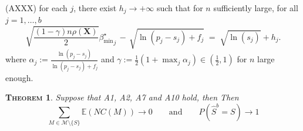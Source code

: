 \documentclass[aos]{imsart}
\theoremstyle{plain}
\newtheorem{thm}{\textsc{Theorem}}[section]
\newcommand{\E}{\mathbb{E}}
\newcommand{\M}{\mathcal{M}}
\newcommand{\bs}{\boldsymbol}
\begin{document}
(AXXX) for each $j$, there exist $h_j\to +\infty$ such that for $n$ sufficiently large, for all $j=1,\ldots,b$
    \begin{equation}\label{cond:suffIIregnonlinpen}
        \sqrt{\frac{(1-\gamma) n\rho(\bs X)}{2}}{{\beta_{\min}^{\star}}_j} \,- \,\sqrt{\ln(p_j-s_j) + f_j} \;=\; \sqrt{\ln(s_j)} + h_j .
    \end{equation}
where $\alpha_j:=\frac{\ln(p_j-s_j)}{\ln(p_j-s_j) + f_j}$ and $\gamma:=\frac12(1+\max_j \alpha_j)\in (\tfrac12,1)$ for $n$ large enough.

\begin{thm}\label{theo:suffcondlinearmodelnonlinpen}
Suppose that A1, A2, A7 and A10 hold, then 
Then $$\sum_{M \in \M\setminus \{S\}}\E\left(NC(M)\right)\to 0 \qquad \mbox{and} \qquad P(\widehat{S}^b = S) \to 1$$
\end{thm}
\end{document}

